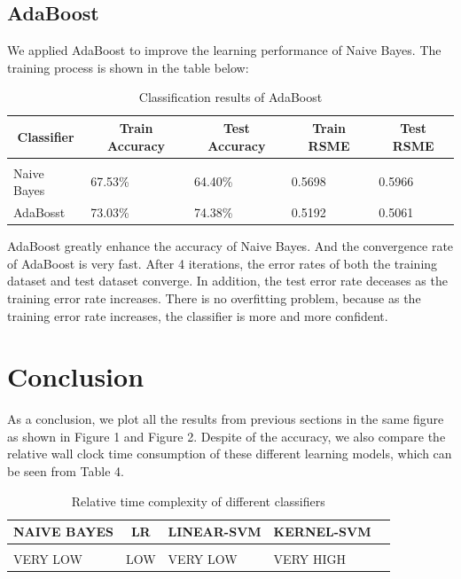 \documentclass{article} %
\begin{document}
\subsection{AdaBoost}
We applied AdaBoost to improve the learning  performance of Naive Bayes. The training process is shown in the table below:

\begin{table}[h]
\caption{Classification results of AdaBoost}
\label{sample-table}
\begin{center}
\begin{tabular}{lllll}
\multicolumn{1}{c}{\bf Classifier}  &\multicolumn{1}{c}{\bf Train Accuracy} &\multicolumn{1}{c}{\bf Test Accuracy} &\multicolumn{1}{c}{\bf Train RSME} &\multicolumn{1}{c}{\bf Test RSME}
\\ \hline \\
Naive Bayes		&67.53\%   &64.40\%   &0.5698   &0.5966\\
AdaBosst	&73.03\%   &74.38\%   &0.5192   &0.5061\\
\end{tabular}
\end{center}
\end{table}

AdaBoost greatly enhance the accuracy of Naive Bayes.  And the convergence rate of AdaBoost is very fast. After 4 iterations, the error rates of both the training dataset and test dataset converge. In addition, the test error rate deceases as the training error rate increases. There is no overfitting problem, because as the training error rate increases, the classifier is more and more confident.

\subsection{}

\section{Conclusion}
As a conclusion, we plot all the results from previous sections in the same figure as shown in Figure 1 and Figure 2. Despite of the accuracy, we also compare the relative wall clock time consumption of these different learning models, which can be seen from Table 4. 

\begin{table}[H]
\caption{Relative time complexity of different classifiers}
\begin{center}
\begin{tabular}{lllll}
\multicolumn{1}{c}{\bf NAIVE BAYES}  &\multicolumn{1}{c}{\bf LR} &\multicolumn{1}{c}{\bf LINEAR-SVM} &\multicolumn{1}{c}{\bf KERNEL-SVM}
\\ \hline \\

VERY LOW  &LOW &VERY LOW &VERY HIGH\\

\end{tabular}
\end{center}
\end{table}
\end{document}
